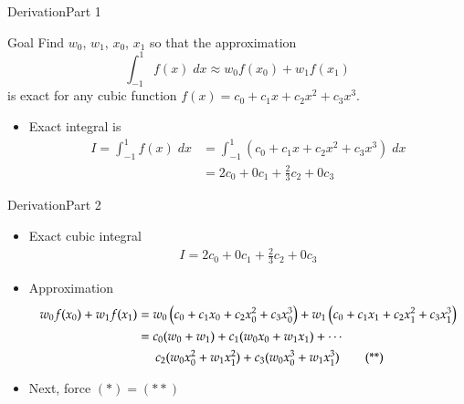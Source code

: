 \documentclass[10pt]{beamer}
\begin{document}
\begin{frame}{Derivation}{Part 1}
\begin{block}{Goal}
Find $w_0$, $w_1$, $x_0$, $x_1$ so that the approximation 
$$\int_{-1}^1 f(x) \; \mathit{dx} \approx w_0 f(x_0) + w_1 f(x_1)$$
is exact for any cubic function $f(x) = c_0 + c_1 x + c_2 x^2 + c_3 x^3$.

\end{block}

\begin{itemize}
    \item Exact integral is
    \begin{align*}
        I=\int_{-1}^1 f(x) \; \mathit{dx} &= \int_{-1}^1 \left( c_0 + c_1 x + c_2 x^2 + c_3 x^3 \right) \; \mathit{dx} \\
        &= 2 c_0 + 0 c_1 + \frac{2}{3}c_2 + 0 c_3
    \end{align*}
\end{itemize}
\end{frame}
\begin{frame}{Derivation}{Part 2}
\begin{itemize}
    \item Exact cubic integral
    \begin{align*}
    I=     2 c_0 + 0 c_1 + \frac{2}{3}c_2 + 0 c_3  \tag{*} 
    \end{align*}

\item Approximation
    {\small
    \begin{align*}
        w_0 f(x_0) + w_1 f(x_1)&= w_0 \left(c_0 + c_1 x_0 + c_2 x_0^2 + c_3 x_0^3 \right) + w_1 \left(c_0 + c_1 x_1 + c_2 x_1^2 + c_3 x_1^3 \right) \\
        &= c_0(w_0+w_1) + c_1 (w_0x_0 +w_1x_1)  + \cdots \\
         & \hspace{5mm} c_2(w_0x_0^2+w_1x_1^2) + c_3(w_0 x_0^3 + w_1 x_1^3)  \tag{**} 
    \end{align*}
    }
\item Next, force $(*)=(**)$


\end{itemize}
\end{frame}
\end{document}
